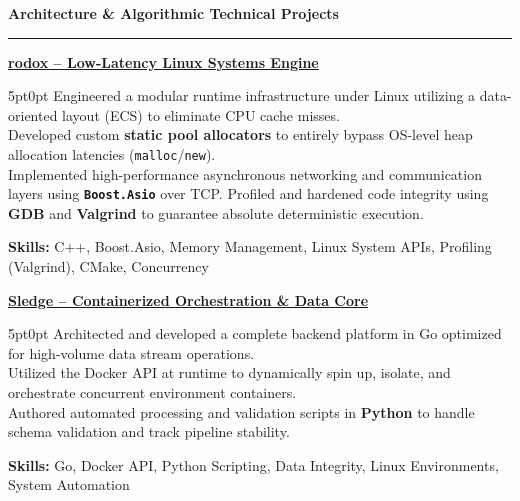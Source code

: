 \documentclass[9pt]{extarticle}
\begin{document}
\par\vspace{5pt}

{\large\bfseries Architecture \& Algorithmic Technical Projects}
\par\vspace{-8pt}
\rule{\linewidth}{0.4pt}
\par\vspace{5pt}

\underline{\bfseries rodox -- Low-Latency Linux Systems Engine} %
\par
\begin{adjustwidth}{5pt}{0pt}
    Engineered a modular runtime infrastructure under Linux utilizing a data-oriented layout (ECS) to eliminate CPU cache misses. \\
    Developed custom {\bfseries static pool allocators} to entirely bypass OS-level heap allocation latencies (\texttt{malloc}/\texttt{new}). \\
    Implemented high-performance asynchronous networking and communication layers using {\bfseries \texttt{Boost.Asio}} over TCP. %
    Profiled and hardened code integrity using {\bfseries GDB} and {\bfseries Valgrind} to guarantee absolute deterministic execution. %
\end{adjustwidth}
\par
{\bfseries Skills:} C++, Boost.Asio, Memory Management, Linux System APIs, Profiling (Valgrind), CMake, Concurrency %

\par\vspace{8pt}

\underline{\bfseries Sledge -- Containerized Orchestration \& Data Core}
\par
\begin{adjustwidth}{5pt}{0pt}
    Architected and developed a complete backend platform in Go optimized for high-volume data stream operations. \\
    Utilized the Docker API at runtime to dynamically spin up, isolate, and orchestrate concurrent environment containers. \\
    Authored automated processing and validation scripts in {\bfseries Python} to handle schema validation and track pipeline stability.
\end{adjustwidth}
\par
{\bfseries Skills:} Go, Docker API, Python Scripting, Data Integrity, Linux Environments, System Automation
\end{document}
